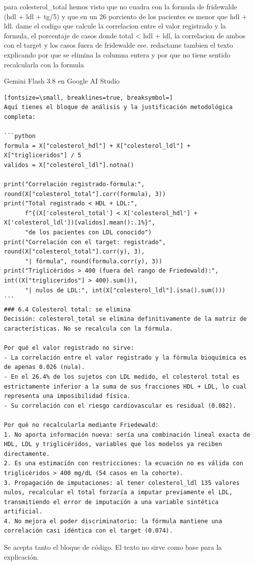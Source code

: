 \documentclass[12pt,a4paper,oneside]{book}
\begin{document}
\begin{iaprompt}
para colesterol_total hemos visto que no cuadra con la formula de fridewalde (hdl + ldl + tg/5) y que en un 26 porciento de los pacientes es menor que hdl + ldl. dame el codigo que calcule la correlacion entre el valor registrado y la formula, el porcentaje de casos donde total < hdl + ldl, la correlacion de ambos con el target y los casos fuera de fridewalde ese. redactame tambien el texto explicando por que se elimina la columna entera y por que no tiene sentido recalcularla con la formula
\end{iaprompt}
\begin{iaresp}{Gemini Flash 3.8 en Google AI Studio}
\begin{Verbatim}[fontsize=\small, breaklines=true, breaksymbol=]
Aquí tienes el bloque de análisis y la justificación metodológica completa:

```python
formula = X["colesterol_hdl"] + X["colesterol_ldl"] + X["trigliceridos"] / 5
validos = X["colesterol_ldl"].notna()

print("Correlación registrado-fórmula:", round(X["colesterol_total"].corr(formula), 3))
print("Total registrado < HDL + LDL:",
      f"{(X['colesterol_total'] < X['colesterol_hdl'] + X['colesterol_ldl'])[validos].mean():.1%}",
      "de los pacientes con LDL conocido")
print("Correlación con el target: registrado", round(X["colesterol_total"].corr(y), 3),
      "| fórmula", round(formula.corr(y), 3))
print("Triglicéridos > 400 (fuera del rango de Friedewald):", int((X["trigliceridos"] > 400).sum()),
      "| nulos de LDL:", int(X["colesterol_ldl"].isna().sum()))
```
### 6.4 Colesterol total: se elimina
Decisión: colesterol_total se elimina definitivamente de la matriz de características. No se recalcula con la fórmula.

Por qué el valor registrado no sirve:
- La correlación entre el valor registrado y la fórmula bioquímica es de apenas 0.026 (nula).
- En el 26.4% de los sujetos con LDL medido, el colesterol total es estrictamente inferior a la suma de sus fracciones HDL + LDL, lo cual representa una imposibilidad física.
- Su correlación con el riesgo cardiovascular es residual (0.082).

Por qué no recalcularla mediante Friedewald:
1. No aporta información nueva: sería una combinación lineal exacta de HDL, LDL y triglicéridos, variables que los modelos ya reciben directamente.
2. Es una estimación con restricciones: la ecuación no es válida con triglicéridos > 400 mg/dL (54 casos en la cohorte).
3. Propagación de imputaciones: al tener colesterol_ldl 135 valores nulos, recalcular el total forzaría a imputar previamente el LDL, transmitiendo el error de imputación a una variable sintética artificial.
4. No mejora el poder discriminatorio: la fórmula mantiene una correlación casi idéntica con el target (0.074).
\end{Verbatim}
\end{iaresp}
\begin{iaanalisis}
Se acepta tanto el bloque de código. El texto no sirve como base para la explicación.
\end{iaanalisis}
\end{document}
